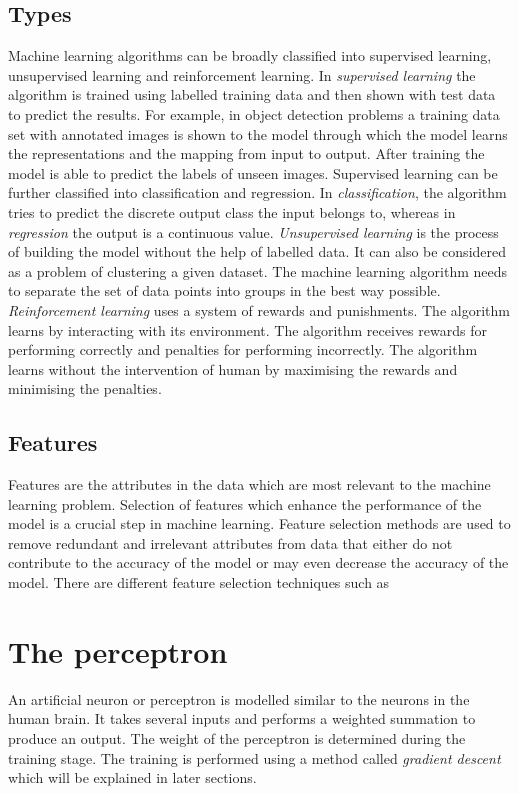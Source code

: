 \documentclass[a4paper, 12pt, oneside, BCOR1cm,toc=chapterentrywithdots]{scrbook}
\begin{document}
\subsection{Types}
Machine learning algorithms can be broadly classified into supervised learning, unsupervised learning and reinforcement learning. In \textit{supervised learning} the algorithm is trained using labelled training data and then shown with test data to predict the results. For example, in object detection problems a training data set with annotated images is shown to the model through which the model learns the representations and the mapping from input to output. After training the model is able to predict the labels of unseen images. Supervised learning can be further classified into classification and regression. In \textit{classification}, the algorithm tries to predict the discrete output class the input belongs to, whereas in \textit{regression} the output is a continuous value. \textit{Unsupervised learning} is the process of building the model without the help of labelled data. It can also be considered as a problem of clustering a given dataset. The machine learning algorithm needs to separate the set of data points into groups in the best way possible. \textit{Reinforcement learning} uses a system of rewards and punishments. The algorithm learns by interacting with its environment. The algorithm receives rewards for performing correctly and penalties for performing incorrectly. The algorithm learns without the intervention of human by maximising the rewards and minimising the penalties. 

\subsection{Features}

Features are the attributes in the data which are most relevant to the machine learning problem. Selection of features which enhance the performance of the model is a crucial step in machine learning. Feature selection methods are used to remove redundant and irrelevant attributes from data that either do not contribute to the accuracy of the model or may even decrease the accuracy of the model. There are different feature selection techniques such as 

\section{The perceptron}
An artificial neuron or perceptron is modelled similar to the neurons in the human brain. It takes several inputs and performs a weighted summation to produce an output. The weight of the perceptron is determined during the training stage. The training is performed using a method called \textit{gradient descent} which will be explained in later sections.  
\end{document}
